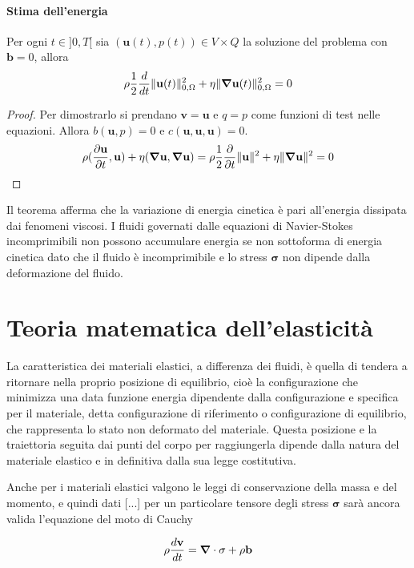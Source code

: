 \paragraph{Stima dell'energia}
\begin{theorem}
Per ogni $t \in ]0,T[$ sia $(\mathbf{u}(t),p(t)) \in V \times Q$ la soluzione del problema con $\mathbf{b}=0$, allora
$$\rho \frac{1}{2} \frac{d}{dt} \Vert \mathbf{u} (t) \Vert^2_{0,\Omega} + \eta \Vert \boldsymbol{\nabla} \mathbf{u} (t) \Vert^2_{0,\Omega} = 0$$
\end{theorem}
\begin{proof}
Per dimostrarlo si prendano $\mathbf{v}=\mathbf{u}$ e $q=p$ come funzioni di test nelle equazioni. Allora $b(\mathbf{u},p)=0$ e $c(\mathbf{u},\mathbf{u},\mathbf{u})=0$.
$$
\rho\ps{\frac{\partial \mathbf{u}}{\partial t}}{\mathbf{u}}+\eta\ps{\Nabla\mathbf{u}}{\Nabla\mathbf{u}} = 
\rho\frac{1}{2}\frac{\partial} {\partial t}\Vert\mathbf{u}\Vert^2+\eta\Vert \Nabla\mathbf{u}\Vert^2 = 0
$$
\end{proof}
Il teorema afferma che la variazione di energia cinetica è pari all'energia dissipata dai fenomeni viscosi.
I fluidi governati dalle equazioni di Navier-Stokes incomprimibili non possono accumulare energia se non sottoforma di energia cinetica dato che il fluido è incomprimibile e lo stress $\boldsymbol{\sigma}$ non dipende dalla deformazione del fluido. 

\section{Teoria matematica dell'elasticità}
La caratteristica dei materiali elastici, a differenza dei fluidi, è quella di tendera a ritornare nella proprio posizione di equilibrio, cioè la configurazione che minimizza una data funzione energia dipendente dalla configurazione e specifica per il materiale, detta configurazione di riferimento o configurazione di equilibrio, che rappresenta lo stato non deformato del materiale. Questa posizione e la traiettoria seguita dai punti del corpo per raggiungerla dipende dalla natura del materiale elastico e in definitiva dalla sua legge costitutiva.

Anche per i materiali elastici valgono le leggi di conservazione della massa e del momento, e quindi dati [...] per un particolare tensore degli stress $\mathbf{\sigma}$ sarà ancora valida l'equazione del moto di Cauchy

$$
\rho\frac{d\mathbf{v}}{dt} = \boldsymbol{\nabla}\cdot \mathbf{\sigma} + \rho\mathbf{b}
$$

